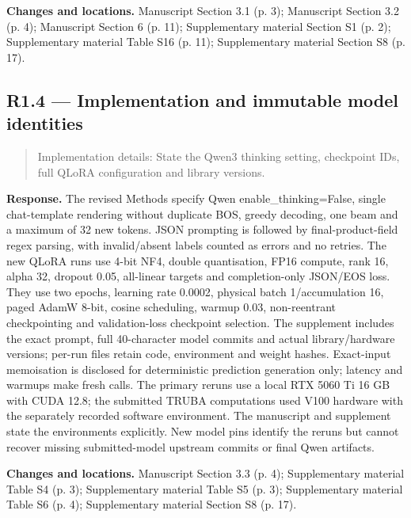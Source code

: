 \documentclass[11pt,a4paper]{article}
\begin{document}
\textbf{Changes and locations.} Manuscript Section 3.1 (p. 3); Manuscript Section 3.2 (p. 4); Manuscript Section 6 (p. 11); Supplementary material Section S1 (p. 2); Supplementary material Table S16 (p. 11); Supplementary material Section S8 (p. 17).

\subsection*{R1.4 — Implementation and immutable model identities}
\begin{quote}\small Implementation details: State the Qwen3 thinking setting, checkpoint IDs, full QLoRA configuration and library versions.\end{quote}
\textbf{Response.} The revised Methods specify Qwen enable\_thinking=False, single chat-template rendering without duplicate BOS, greedy decoding, one beam and a maximum of 32 new tokens. JSON prompting is followed by final-product-field regex parsing, with invalid/absent labels counted as errors and no retries. The new QLoRA runs use 4-bit NF4, double quantisation, FP16 compute, rank 16, alpha 32, dropout 0.05, all-linear targets and completion-only JSON/EOS loss. They use two epochs, learning rate 0.0002, physical batch 1/accumulation 16, paged AdamW 8-bit, cosine scheduling, warmup 0.03, non-reentrant checkpointing and validation-loss checkpoint selection. The supplement includes the exact prompt, full 40-character model commits and actual library/hardware versions; per-run files retain code, environment and weight hashes. Exact-input memoisation is disclosed for deterministic prediction generation only; latency and warmups make fresh calls. The primary reruns use a local RTX 5060 Ti 16 GB with CUDA 12.8; the submitted TRUBA computations used V100 hardware with the separately recorded software environment. The manuscript and supplement state the environments explicitly. New model pins identify the reruns but cannot recover missing submitted-model upstream commits or final Qwen artifacts.

\textbf{Changes and locations.} Manuscript Section 3.3 (p. 4); Supplementary material Table S4 (p. 3); Supplementary material Table S5 (p. 3); Supplementary material Table S6 (p. 4); Supplementary material Section S8 (p. 17).
\end{document}
